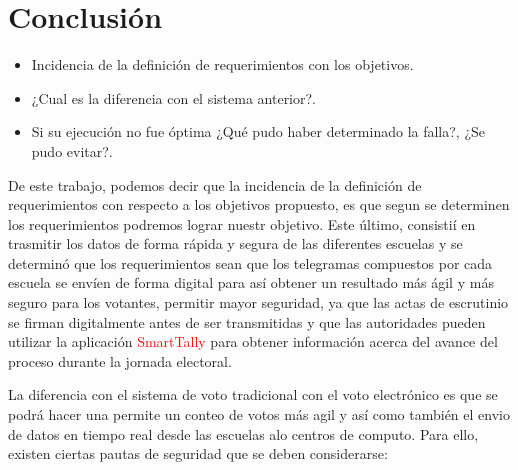 \documentclass[titlepage,a4paper,twoside]{article}
\begin{document}
    
    \section{Conclusión}
    

    \begin{itemize}
    	\item Incidencia de la definición de requerimientos con los objetivos.
    	\item ¿Cual es la diferencia con el sistema anterior?.
    	\item Si su ejecución no fue óptima ¿Qué pudo haber determinado la falla?, ¿Se pudo evitar?.
    \end{itemize}

    De este trabajo, podemos decir que la incidencia de la definición de requerimientos con respecto a los objetivos propuesto, es que segun se determinen los requerimientos podremos lograr nuestr objetivo. Este último, consistií en trasmitir los datos de forma rápida y segura de las diferentes escuelas y se determinó que los requerimientos sean que los telegramas compuestos por cada escuela se envíen de forma digital para así obtener un resultado más ágil y más seguro para los votantes, permitir mayor seguridad, ya que las actas de escrutinio se firman digitalmente antes de ser transmitidas y que las autoridades pueden utilizar la aplicación \textcolor{red}{SmartTally} para obtener información acerca del avance del proceso durante la jornada electoral.    
    
    La diferencia con el sistema de voto tradicional con el voto electrónico es que se podrá hacer una permite un conteo de votos más agil y así como también el envio de datos en tiempo real desde las escuelas alo centros de computo. Para ello, existen ciertas pautas de seguridad que se deben considerarse:
    
\end{document}
